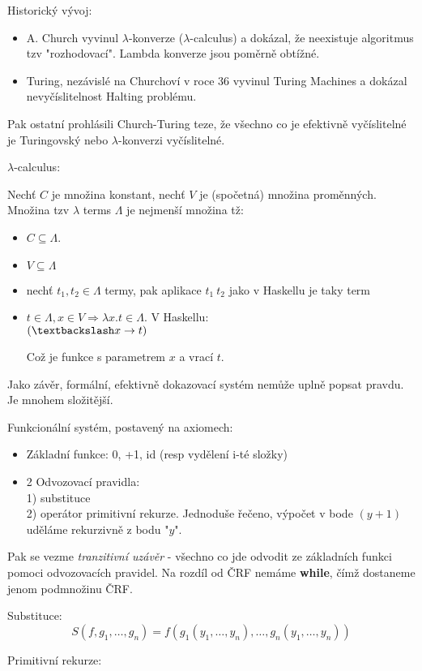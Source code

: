 \begin{note}
	Historický vývoj:
	\begin{itemize}
		\item A. Church vyvinul $\lambda$-konverze ($\lambda$-calculus) a dokázal, že neexistuje algoritmus tzv "rozhodovací".
		Lambda konverze jsou poměrně obtížné.
		\item Turing, nezávislé na Churchoví v roce 36 vyvinul Turing Machines a dokázal nevyčíslitelnost Halting problému.
	\end{itemize}

	Pak ostatní prohlásili Church-Turing teze, že všechno co je efektivně vyčíslitelné je Turingovský nebo $\lambda$-konverzi vyčíslitelné.
\end{note}

\begin{definition}
	$\lambda$-calculus:

	Nechť $C$ je množina konstant, nechť $V$ je (spočetná) množina proměnných.
	Množina tzv $\lambda$ terms $\Lambda$ je nejmenší množina tž:
	\begin{itemize}
		\item $C \subseteq \Lambda$.
		\item $V \subseteq \Lambda$
		\item nechť $t_1, t_2 \in \Lambda$ termy, pak aplikace $t_1\ t_2$ jako v Haskellu je taky term
		\item $t \in \Lambda, x \in V \Rightarrow \lambda x . t \in \Lambda$.
			V Haskellu:\\ $(\textbackslash x \to t)$

			Což je funkce s parametrem $x$ a vrací $t$.
	\end{itemize}
\end{definition}

Jako závěr, formální, efektivně dokazovací systém nemůže uplně popsat pravdu. Je mnohem složitější.

\begin{note}
	Funkcionální systém, postavený na axiomech:
	\begin{itemize}
		\item Základní funkce: 0, +1, id (resp vydělení i-té složky)
		\item 2 Odvozovací pravidla:\\
			1) substituce \\
			2) operátor primitivní rekurze.
			Jednoduše řečeno, výpočet v bode $(y + 1)$ uděláme rekurzivně z bodu "$y$".
	\end{itemize}

	Pak se vezme \emph{tranzitivní uzávěr} - všechno co jde odvodit ze základních funkci pomoci odvozovacích pravidel.
	Na rozdíl od ČRF nemáme \textbf{while}, čímž dostaneme jenom podmnožinu ČRF.

	Substituce:
	\[ S(f, g_1, \ldots, g_n) = f(g_1(y_1, \ldots, y_n), \ldots, g_n(y_1, \ldots, y_n)) \]

	Primitivní rekurze:

\end{note}

